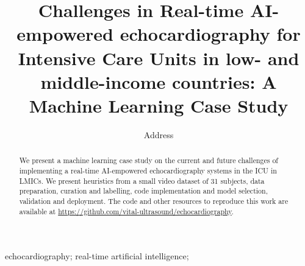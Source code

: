 \documentclass[mlabstract,twocolumn]{jmlr}
\title[Short Title]{
Challenges in Real-time AI-empowered echocardiography for Intensive Care Units in low- and middle-income countries: A Machine Learning Case Study %
}
\author{
     \Name{Anonymous Author(s)} \Email{email@sample.com}
      \addr Address
   }
\begin{document}
\maketitle

\begin{abstract}
We present a machine learning case study on the current and future challenges of implementing a real-time AI-empowered echocardiography systems in the ICU in LMICs.
We present heuristics from a small video dataset of 31 subjects, data preparation, curation and labelling, code implementation and model selection, validation and deployment.
The code and other resources to reproduce this work are available at \url{https://github.com/vital-ultrasound/echocardiography}.
\end{abstract}
\begin{keywords}
echocardiography; real-time artificial intelligence;
\end{keywords}
\end{document}
